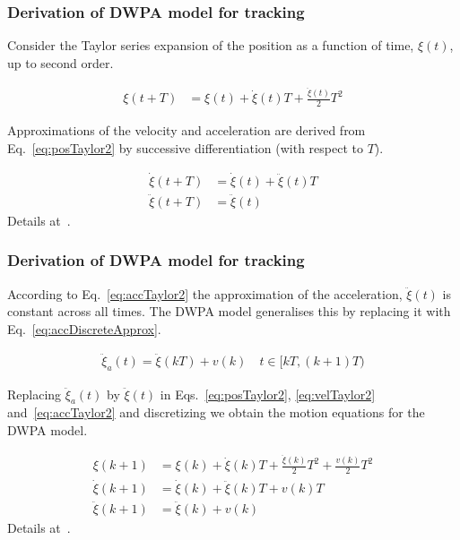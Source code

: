 \begin{frame}
    \frametitle{Derivation of DWPA model for tracking}

    Consider the Taylor series expansion of the position as a function of time,
    $\xi(t)$, up to second order.

    \begin{align}
        \xi(t+T)&=\xi(t)+\dot{\xi}(t)T+\frac{\ddot{\xi}(t)}{2}T^2\label{eq:posTaylor2}
    \end{align}

    Approximations of the velocity and acceleration are derived from
    Eq.~\ref{eq:posTaylor2} by successive differentiation (with respect to
    $T$).

    \begin{align}
        \dot{\xi}(t+T)&=\dot{\xi}(t)+\ddot{\xi}(t)T\label{eq:velTaylor2}\\
        \ddot{\xi}(t+T)&=\ddot{\xi}(t)\label{eq:accTaylor2}
    \end{align}
    \hfill\tiny Details at~\citet{rapela26}.

\end{frame}

\begin{frame}
    \frametitle{Derivation of DWPA model for tracking}

    According to Eq.~\ref{eq:accTaylor2} the approximation of the acceleration,
    $\ddot{\xi}(t)$ is constant across all times. The DWPA model generalises
    this by replacing it with Eq.~\ref{eq:accDiscreteApprox}.

    \begin{align}
        \ddot{\xi}_a(t)=\ddot{\xi}(kT)+v(k)\quad t\in[kT,(k+1)T)\label{eq:accDiscreteApprox}
    \end{align}

    Replacing $\ddot{\xi}_a(t)$ by $\ddot{\xi}(t)$ in Eqs.~\ref{eq:posTaylor2},
    \ref{eq:velTaylor2} and~\ref{eq:accTaylor2} and discretizing we obtain the
    motion equations for the DWPA model.

    \begin{align}
        \xi(k+1)&=\xi(k)+\dot{\xi}(k)T+\frac{\ddot{\xi}(k)}{2}T^2+\frac{v(k)}{2}T^2\label{eq:posDWPA}\\
        \dot{\xi}(k+1)&=\dot{\xi}(k)+\ddot{\xi}(k)T+v(k)T\label{eq:velDWPA}\\
        \ddot{\xi}(k+1)&=\ddot{\xi}(k)+v(k)\label{eq:accDWPA}
    \end{align}
    \hfill\tiny Details at~\citet{rapela26}.

\end{frame}

